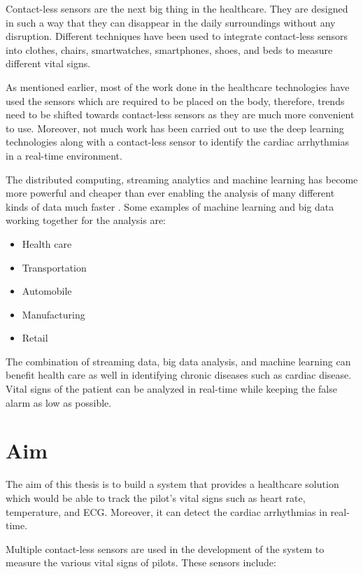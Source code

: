 Contact-less sensors are the next big thing in the healthcare. They are designed in such a way that they can disappear in the daily surroundings without any disruption. Different techniques have been used to integrate contact-less sensors into clothes, chairs, smartwatches, smartphones, shoes, and beds to measure different vital signs.


As mentioned earlier, most of the work done in the healthcare technologies have used the sensors which are required to be placed on the body, therefore, trends need to be shifted towards contact-less sensors as they are much more convenient to use. Moreover, not much work has been carried out to use the deep learning technologies along with a contact-less sensor to identify the cardiac arrhythmias in a real-time environment. 


The distributed computing, streaming analytics and machine learning has become more powerful and cheaper than ever enabling the analysis of many different kinds of data much faster \cite{maprmliotmed}. Some examples of machine learning and big data working together for the analysis are:

\begin{itemize}
	\item Health care
	\item Transportation
	\item Automobile
	\item Manufacturing
	\item Retail
\end{itemize}


The combination of streaming data, big data analysis, and machine learning can benefit health care as well in identifying chronic diseases such as cardiac disease. Vital signs of the patient can be analyzed in real-time while keeping the false alarm as low as possible.

\section{Aim}

The aim of this thesis is to build a system that provides a healthcare solution which would be able to track the pilot's vital signs such as heart rate, temperature, and ECG. Moreover, it can detect the cardiac arrhythmias in real-time.

Multiple contact-less sensors are used in the development of the system to measure the various vital signs of pilots. These sensors include:

